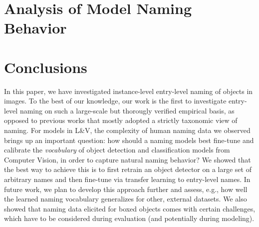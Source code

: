 \documentclass[11pt,a4paper]{article}
\newcommand{\lv}{L\&V\xspace}
\newcommand{\arbitrary}{arbitrary\xspace}
\begin{document}
\section{Analysis of Model Naming Behavior}
\label{sec:analysis}


\section{Conclusions}
\label{sec:conclusions}
In this paper, we have investigated instance-level entry-level naming of objects in images.
To the best of our knowledge, our work is the first to investigate entry-level naming on such a large-scale but thorougly verified empirical basis, 
as opposed to previous works that mostly adopted a strictly taxonomic view of naming.
For models in \lv, the complexity of human naming data we observed brings up an important question: how should a naming models best fine-tune and calibrate the \textit{vocabulary} of object detection and classification models from Computer Vision, in order to capture natural naming behavior?
We showed that the best way to achieve this is to first retrain an object detector on a large set of \arbitrary names and then fine-tune via transfer learning to entry-level names. 
In future work, we plan to develop this approach further and assess, e.g., how well the learned naming vocabulary generalizes for other, external datasets.
We also showed that naming data elicited for boxed objects comes with certain challenges, which have to be considered during evaluation (and potentially during modeling). 

%
%

%
\end{document}
